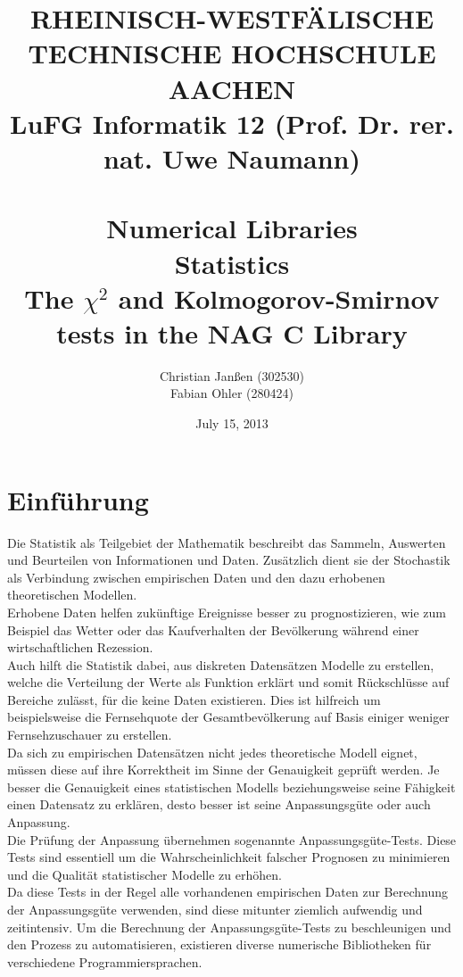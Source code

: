 \documentclass{article}
\title{
{\bf \scriptsize RHEINISCH-WESTF\"ALISCHE TECHNISCHE HOCHSCHULE AACHEN \\
LuFG Informatik 12 (Prof. Dr. rer. nat. Uwe Naumann)}
\vspace{.5cm} \\
\epsfig{file=figures/STCE_Logo_WWW.eps,width=.7\textwidth}
\vspace{1cm} \\
{\bf \Large Numerical Libraries} \\
{\bf \large Statistics} \\
{\large The $\chi^2$ and Kolmogorov-Smirnov tests in the NAG C Library}
}
\author{Christian Janßen (302530) \\ Fabian Ohler (280424) }
\date{July 15, 2013}
\begin{document}

\begin{titlepage}
\clearpage
\maketitle
\thispagestyle{empty}
\end{titlepage}

\tableofcontents

\pagestyle{headings}
\newpage


\section{Einführung}
Die Statistik als Teilgebiet der Mathematik beschreibt das Sammeln, Auswerten und Beurteilen von Informationen und Daten.
Zusätzlich dient sie der Stochastik als Verbindung zwischen empirischen Daten und den dazu erhobenen theoretischen Modellen.\\
Erhobene Daten helfen zukünftige Ereignisse besser zu prognostizieren, wie zum Beispiel das Wetter oder das Kaufverhalten der Bevölkerung während einer wirtschaftlichen Rezession.\\
Auch hilft die Statistik dabei, aus diskreten Datensätzen Modelle zu erstellen, welche die Verteilung der Werte als Funktion erklärt und somit Rückschlüsse auf Bereiche zulässt, für die keine Daten existieren. Dies ist hilfreich um beispielsweise die Fernsehquote der Gesamtbevölkerung auf Basis einiger weniger Fernsehzuschauer zu erstellen.\\
Da sich zu empirischen Datensätzen nicht jedes theoretische Modell eignet, müssen diese auf ihre Korrektheit im Sinne der Genauigkeit geprüft werden. Je besser die Genauigkeit eines statistischen Modells beziehungsweise seine Fähigkeit einen Datensatz zu erklären, desto besser ist seine Anpassungsgüte oder auch Anpassung.\\
Die Prüfung der Anpassung übernehmen sogenannte Anpassungsgüte-Tests. Diese Tests sind essentiell um die Wahrscheinlichkeit falscher Prognosen zu minimieren und die Qualität statistischer Modelle zu erhöhen.\\
Da diese Tests in der Regel alle vorhandenen empirischen Daten zur Berechnung der Anpassungsgüte verwenden, sind diese mitunter ziemlich aufwendig und zeitintensiv. Um die Berechnung der Anpassungsgüte-Tests zu beschleunigen und den Prozess zu automatisieren, existieren diverse numerische Bibliotheken für verschiedene Programmiersprachen.\\
\end{document}
